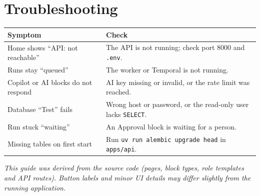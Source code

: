 \documentclass[11pt,a4paper]{article}
\begin{document}
\section{Troubleshooting}

\begin{longtable}{@{}L{5.6cm}L{10cm}@{}}
\toprule
\textbf{Symptom} & \textbf{Check} \\
\midrule
\endhead
Home shows ``API: not reachable'' & The API is not running; check port 8000 and \texttt{.env}. \\
Runs stay ``queued'' & The worker or Temporal is not running. \\
Copilot or AI blocks do not respond & AI key missing or invalid, or the rate limit was reached. \\
Database ``Test'' fails & Wrong host or password, or the read-only user lacks \texttt{SELECT}. \\
Run stuck ``waiting'' & An Approval block is waiting for a person. \\
Missing tables on first start & Run \texttt{uv run alembic upgrade head} in \texttt{apps/api}. \\
\bottomrule
\end{longtable}

\vfill
\begin{center}
\footnotesize\textit{This guide was derived from the source code (pages, block types, role templates and API routes).
Button labels and minor UI details may differ slightly from the running application.}
\end{center}
\end{document}
